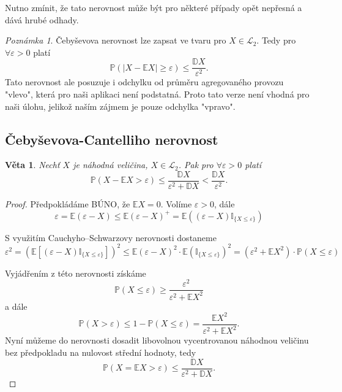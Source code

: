 \documentclass{article}
\newtheorem{theorem}[subsubsection]{Věta}
\theoremstyle{remark}
\newtheorem*{remark}{Poznámka}
\theoremstyle{plain}
\theoremstyle{definition}
\theoremstyle{remark}
\begin{document}
Nutno zmínit, že tato nerovnost může být pro některé případy opět nepřesná a dává hrubé odhady.

\begin{remark}
Čebyševova nerovnost lze zapsat ve tvaru pro $X \in \mathscr{L}_2$. Tedy pro $\forall \varepsilon > 0$ platí 
$$
\mathbb{P}\left( |X - \mathbb{E}X| \geq \varepsilon \right)  \leq \frac{\mathbb{D}X}{\varepsilon^{2}}.
$$
Tato nerovnost ale posuzuje i odchylku od průměru agregovaného provozu "vlevo", která pro naši aplikaci není podstatná. Proto tato verze není vhodná pro naši úlohu, jelikož naším zájmem je pouze odchylka "vpravo".
\end{remark}

\subsection{Čebyševova-Cantelliho nerovnost}
\begin{theorem}
Nechť $X$ je náhodná veličina, $X \in \mathscr{L}_2$. Pak pro $\forall \varepsilon > 0$ platí 
$$
\mathbb{P}\left( X - \mathbb{E}X > \varepsilon \right)  \leq \frac{\mathbb{D} X}{\varepsilon^{2} + \mathbb{D} X} < \frac{\mathbb{D} X}{\varepsilon^{2}}.
$$
\end{theorem}

\begin{proof}
Předpokládáme BÚNO, že $\mathbb{E}X = 0$. Volíme $\varepsilon > 0$, dále 
$$
\varepsilon = \mathbb{E}\left(\varepsilon - X \right) \leq \mathbb{E}\left(\varepsilon - X \right)^{+} = \mathbb{E}\left(\left(\varepsilon - X \right) \mathbb{I}_{\{X \leq \varepsilon\}} \right)
$$

S využitím Cauchyho–Schwarzovy nerovnosti dostaneme
$$
\varepsilon^{2} = \left(\mathbb{E}\left[\left(\varepsilon - X \right) \mathbb{I}_{\{X \leq \varepsilon\}} \right]\right)^{2} \leq \mathbb{E}\left(\varepsilon - X \right)^{2} \cdot \mathbb{E}\left(\mathbb{I}_{\{X \leq \varepsilon\}}\right)^{2} = \left( \varepsilon^2 + \mathbb{E}X^2\right) \cdot \mathbb{P}\left(X \leq \varepsilon\right)
$$

Vyjádřením z této nerovnosti získáme 
$$
\mathbb{P}\left(X \leq \varepsilon\right) \geq \frac{\varepsilon^{2}}{\varepsilon^{2} + \mathbb{E}X^{2}}
$$
a dále
$$
\mathbb{P}\left(X > \varepsilon\right) \leq
1 - \mathbb{P}\left(X \leq \varepsilon\right) = \frac{\mathbb{E}X^{2}}{\varepsilon^{2} + \mathbb{E}X^{2}}.
$$
Nyní můžeme do nerovnosti dosadit libovolnou vycentrovanou náhodnou veličinu bez předpokladu na nulovost střední hodnoty, tedy
$$
\mathbb{P}\left(X = \mathbb{E}X > \varepsilon\right) \leq \frac{\mathbb{D}X}{\varepsilon^{2} + \mathbb{D}X}.
$$
\end{proof}
\end{document}
